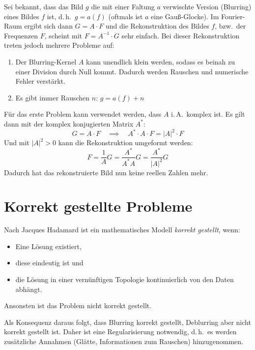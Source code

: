 \documentclass[a4paper, 11pt, accentcolor = tud3b]{tudreport}
\renewcommand{\dh}{d.\,h.~}
\newcommand{\bzw}{bzw.~}
\newcommand{\iA}{i.\,A.~}
\begin{document}
		Sei bekannt, dass das Bild \(g\) die mit einer Faltung \(a\) verwischte Version (Blurring) eines Bildes \(f\) ist, \dh \( g = a(f) \) (oftmals ist \(a\) eine Gauß-Glocke). Im Fourier-Raum ergibt sich dann \( G = A \cdot F \) und die Rekonstruktion des Bildes \(f\), \bzw der Frequenzen \(F\), scheint mit \( F = A^{-1} \cdot G \) sehr einfach. Bei dieser Rekonstruktion treten jedoch mehrere Probleme auf:
		\begin{enumerate}
			\item Der Blurring-Kernel \(A\) kann unendlich klein werden, sodass es beinah zu einer Division durch Null kommt. Dadurch werden Rauschen und numerische Fehler verstärkt.
			\item Es gibt immer Rauschen \(n\): \( g = a(f) + n \)
		\end{enumerate}
		Für das erste Problem kann verwendet werden, dass \(A\) \iA komplex ist. Es gilt dann mit der komplex konjugierten Matrix \( A^\ast \):
		\begin{equation*}
			G = A \cdot F \quad\implies\quad A^\ast \cdot A \cdot F = \lvert A \rvert^2 \cdot F
		\end{equation*}
		Und mit \( \lvert A \rvert^2 > 0 \) kann die Rekonstruktion umgeformt werden:
		\begin{equation*}
			F = \frac{1}{A} G = \frac{A^\ast}{A^\ast A} G = \frac{A^\ast}{\lvert A \rvert^2} G
		\end{equation*}
		Dadurch hat das rekonstruierte Bild nun keine reellen Zahlen mehr.

		\section{Korrekt gestellte Probleme}
			Nach Jacques Hadamard ist ein mathematisches Modell \emph{korrekt gestellt}, wenn:
			\begin{itemize}
				\item Eine Lösung existiert,
				\item diese eindeutig ist und
				\item die Lösung in einer vernünftigen Topologie kontinuierlich von den Daten abhängt.
			\end{itemize}
			Ansonsten ist das Problem nicht korrekt gestellt.
			
			Als Konsequenz daraus folgt, dass Blurring korrekt gestellt, Deblurring aber nicht korrekt gestellt ist. Daher ist eine Regularisierung notwendig, \dh es werden zusätzliche Annahmen (Glätte, Informationen zum Rauschen) hinzugenommen.
\end{document}
